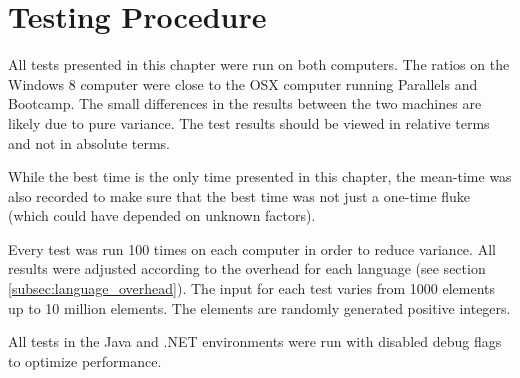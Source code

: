 \section{Testing Procedure}
All tests presented in this chapter were run on both computers. The ratios on the Windows 8 computer were close to the OSX computer running Parallels and Bootcamp. The small differences in the results between the two machines are likely due to pure variance. The test results should be viewed in relative terms and not in absolute terms.

While the best time is the only time presented in this chapter, the mean-time was also recorded to make sure that the best time was not just a one-time fluke (which could have depended on unknown factors).

Every test was run 100 times on each computer in order to reduce variance. All results were adjusted according to the overhead for each language (see section \ref{subsec:language_overhead}). The input for each test varies from 1000 elements up to 10 million elements. The elements are randomly generated positive integers.

All tests in the Java and .NET environments were run with disabled debug flags to optimize performance.
